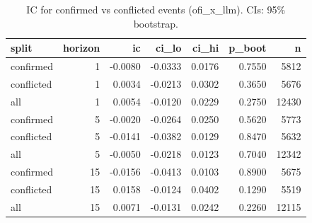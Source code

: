 \begin{table}[htbp]
\centering
\caption{IC for confirmed vs conflicted events (ofi\_x\_llm). CIs: 95\% bootstrap.}
\label{tab:confirmed_ic}
\begin{tabular}{lrrrrrr}
\toprule
split & horizon & ic & ci\_lo & ci\_hi & p\_boot & n \\
\midrule
confirmed & 1 & -0.0080 & -0.0333 & 0.0176 & 0.7550 & 5812 \\
conflicted & 1 & 0.0034 & -0.0213 & 0.0302 & 0.3650 & 5676 \\
all & 1 & 0.0054 & -0.0120 & 0.0229 & 0.2750 & 12430 \\
confirmed & 5 & -0.0020 & -0.0264 & 0.0250 & 0.5620 & 5773 \\
conflicted & 5 & -0.0141 & -0.0382 & 0.0129 & 0.8470 & 5632 \\
all & 5 & -0.0050 & -0.0218 & 0.0123 & 0.7040 & 12342 \\
confirmed & 15 & -0.0156 & -0.0413 & 0.0103 & 0.8900 & 5675 \\
conflicted & 15 & 0.0158 & -0.0124 & 0.0402 & 0.1290 & 5519 \\
all & 15 & 0.0071 & -0.0131 & 0.0242 & 0.2260 & 12115 \\
\bottomrule
\end{tabular}
\end{table}
